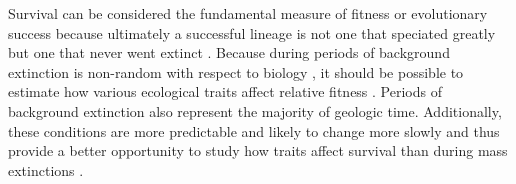 \documentclass[12pt,letterpaper]{article}
\begin{document}



Survival can be considered the fundamental measure of fitness or evolutionary success because ultimately a successful lineage is not one that speciated greatly but one that never went extinct \citep{Cooper1984,Palmer2012}. Because during periods of background extinction is non-random with respect to biology \citep{Jablonski1986}, it should be possible to estimate how various ecological traits affect relative fitness \citep{Kitchell1990,Kitchell1985a}. Periods of background extinction also represent the majority of geologic time. Additionally, these conditions are more predictable and likely to change more slowly and thus provide a better opportunity to study how traits affect survival than during mass extinctions \citep{Jablonski1986,Raup1988}.
\end{document}
